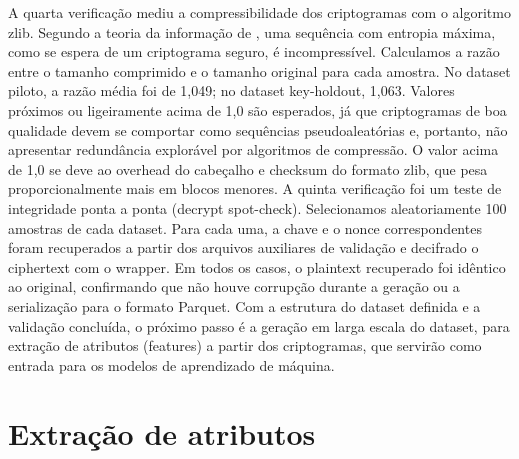A quarta verificação mediu a compressibilidade dos criptogramas com o algoritmo zlib. Segundo a teoria da informação de , uma sequência com entropia máxima, como se espera de um criptograma seguro, é incompressível. Calculamos a razão entre o tamanho comprimido e o tamanho original para cada amostra. No dataset piloto, a razão média foi de 1,049; no dataset key-holdout, 1,063. Valores próximos ou ligeiramente acima de 1,0 são esperados, já que criptogramas de boa qualidade devem se comportar como sequências pseudoaleatórias e, portanto, não apresentar redundância explorável por algoritmos de compressão. O valor acima de 1,0 se deve ao overhead do cabeçalho e checksum do formato zlib, que pesa proporcionalmente mais em blocos menores.
A quinta verificação foi um teste de integridade ponta a ponta (decrypt spot-check). Selecionamos aleatoriamente 100 amostras de cada dataset. Para cada uma, a chave e o nonce correspondentes  foram recuperados a partir dos arquivos auxiliares de validação e decifrado o ciphertext com o wrapper. Em todos os casos, o plaintext recuperado foi idêntico ao original, confirmando que não houve corrupção durante a geração ou a serialização para o formato Parquet.
Com a estrutura do dataset definida e a validação concluída, o próximo passo é a geração em larga escala do dataset, para extração de atributos (features) a partir dos criptogramas, que servirão como entrada para os modelos de aprendizado de máquina.

\section{Extração de atributos}
\label{sec:extracao-atributos}

